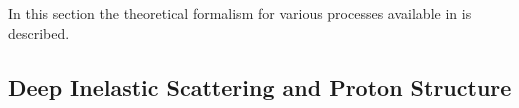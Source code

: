 

%
In this section the theoretical formalism for various processes available in \fitter is described.



\subsection{Deep Inelastic Scattering and Proton Structure}
\label{dissection}


